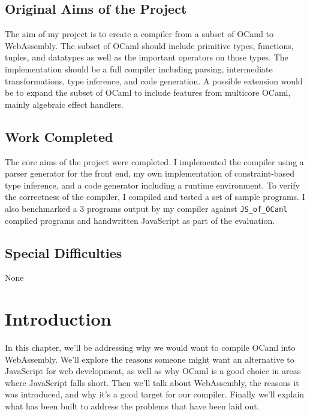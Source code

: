 \documentclass[12pt,a4paper,twoside,openright]{report}
\newcommand{\JSofOCaml}{{\tt JS\_of\_OCaml} }
\begin{document}
\section*{Original Aims of the Project}
The aim of my project is to create a compiler from a subset of OCaml to WebAssembly.
The subset of OCaml should include primitive types, functions, tuples, and datatypes as well as the important operators on those types.
The implementation should be a full compiler including parsing, intermediate transformations, type inference, and code generation.
A possible extension would be to expand the subset of OCaml to include features from multicore OCaml, mainly algebraic effect handlers.
\vspace{-1.5em}

\section*{Work Completed}
The core aims of the project were completed.
I implemented the compiler using a parser generator for the front end, my own implementation of constraint-based type inference, and a code generator including a runtime environment.
To verify the correctness of the compiler, I compiled and tested a set of sample programs.
I also benchmarked a 3 programs output by my compiler against \JSofOCaml compiled programs and handwritten JavaScript as part of the evaluation.
\vspace{-1.5em}

\section*{Special Difficulties}
None

\tableofcontents

\listoffigures


\pagestyle{headings}

\chapter{Introduction}
In this chapter, we'll be addressing why we would want to compile OCaml into WebAssembly.
We'll explore the reasons someone might want an alternative to JavaScript for web development, as well as why OCaml is a good choice in areas where JavaScript falls short.
Then we'll talk about WebAssembly, the reasons it was introduced, and why it's a good target for our compiler.
Finally we'll explain what has been built to address the problems that have been laid out.
\end{document}
